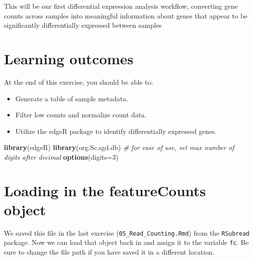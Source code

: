 \documentclass[
]{book}
\newenvironment{Shaded}{\begin{snugshade}}{\end{snugshade}}
\newcommand{\AttributeTok}[1]{\textcolor[rgb]{0.13,0.29,0.53}{#1}}
\newcommand{\CommentTok}[1]{\textcolor[rgb]{0.56,0.35,0.01}{\textit{#1}}}
\newcommand{\DecValTok}[1]{\textcolor[rgb]{0.00,0.00,0.81}{#1}}
\newcommand{\FunctionTok}[1]{\textcolor[rgb]{0.13,0.29,0.53}{\textbf{#1}}}
\newcommand{\NormalTok}[1]{#1}
\newcommand{\OtherTok}[1]{\textcolor[rgb]{0.56,0.35,0.01}{#1}}
\newcommand{\SpecialCharTok}[1]{\textcolor[rgb]{0.81,0.36,0.00}{\textbf{#1}}}
\newcommand{\StringTok}[1]{\textcolor[rgb]{0.31,0.60,0.02}{#1}}
\providecommand{\tightlist}{%
  \setlength{\itemsep}{0pt}\setlength{\parskip}{0pt}}
\begin{document}
This will be our first differential expression analysis workflow,
converting gene counts across samples into meaningful information about
genes that appear to be significantly differentially expressed between
samples

\hypertarget{learning-outcomes-3}{%
\section{Learning outcomes}\label{learning-outcomes-3}}

At the end of this exercise, you should be able to:

\begin{itemize}
\tightlist
\item
  Generate a table of sample metadata.
\item
  Filter low counts and normalize count data.
\item
  Utilize the edgeR package to identify differentially expressed
  genes.
\end{itemize}

\begin{Shaded}
\begin{Highlighting}[]
\FunctionTok{library}\NormalTok{(edgeR)}
\FunctionTok{library}\NormalTok{(org.Sc.sgd.db)}
\CommentTok{\# for ease of use, set max number of digits after decimal}
\FunctionTok{options}\NormalTok{(}\AttributeTok{digits=}\DecValTok{3}\NormalTok{)}
\end{Highlighting}
\end{Shaded}

\hypertarget{loading-in-the-featurecounts-object}{%
\section{Loading in the featureCounts object}\label{loading-in-the-featurecounts-object}}

We saved this file in the last exercise (\texttt{05\_Read\_Counting.Rmd}) from the
\texttt{RSubread} package. Now we can load that object back in and assign it to
the variable \texttt{fc}. Be sure to change the file path if you have saved it
in a different location.

\begin{Shaded}
\end{Shaded}
\end{document}
